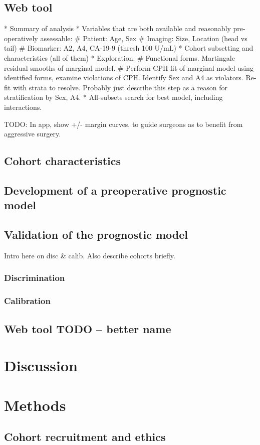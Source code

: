 \documentclass[dissertation.tex]{subfiles}
\begin{document}
\subsection{Web tool}

* Summary of analysis
* Variables that are both available and reasonably pre-operatively assessable:
  # Patient:   Age, Sex
  # Imaging:   Size, Location (head vs tail)
  # Biomarker: A2, A4, CA-19-9 (thresh 100 U/mL)
* Cohort subsetting and characteristics (all of them)
* Exploration.
  # Functional forms.  Martingale residual smooths of marginal model.
  # Perform CPH fit of marginal model using identified forms, examine violations of CPH.  Identify Sex and A4 as violators.  Re-fit with strata to resolve.  Probably just describe this step as a reason for stratification by Sex, A4.
* All-subsets search for best model, including interactions.


TODO: In app, show +/- margin curves, to guide surgeons as to benefit from aggressive surgery.


\subsection{Cohort characteristics}
\label{subsec:nomo-results-cohort}

\subsection{Development of a preoperative prognostic model}

\subsection{Validation of the prognostic model}
Intro here on disc \& calib.  Also describe cohorts briefly.
\subsubsection{Discrimination}
\subsubsection{Calibration}

\subsection{Web tool TODO -- better name}

\section{Discussion}

\section{Methods}
\subsection{Cohort recruitment and ethics}
\label{subsec:nomo-methods-cohort}
\end{document}
